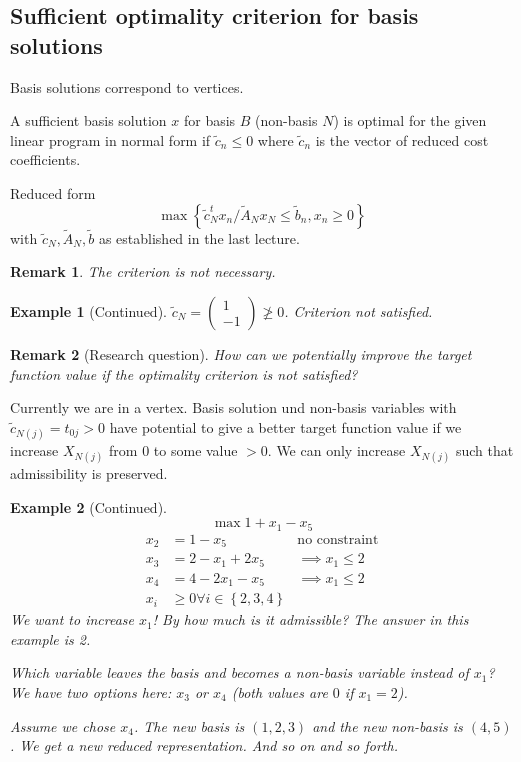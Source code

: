 \documentclass[a4paper]{article}
\numberwithin{lecref}{section}
\newtheorem*{Example}{Example}
\newtheorem*{Remark}{Remark}
\newcommand{\Set}[1]{\left\{#1\right\}}
\begin{document}
\subsection{Sufficient optimality criterion for basis solutions}

Basis solutions correspond to vertices.

A sufficient basis solution $x$ for basis $B$ (non-basis $N$) is optimal for the given linear program in normal form
if $\tilde c_n \leq 0$ where $\tilde c_n$ is the vector of reduced cost coefficients.

\begin{mdframed}
	Reduced form
	\[ \max\Set{\tilde c_N^t x_n / \tilde A_N x_N \leq \tilde b_n, x_n \geq 0} \]
	with $\tilde c_N, \tilde A_N, \tilde b$ as established in the last lecture.
\end{mdframed}

\begin{Remark}
	The criterion is not necessary.
\end{Remark}

\begin{Example}[Continued]
	$\tilde c_N = \begin{pmatrix} 1 \\ -1 \end{pmatrix} \not\geq 0$. Criterion not satisfied.
\end{Example}

\begin{Remark}[Research question]
	How can we potentially improve the target function value if the optimality criterion is not satisfied?
\end{Remark}

Currently we are in a vertex. Basis solution und non-basis variables with $\tilde c_{N(j)} = t_{0j} > 0$ have potential to give a better target function value if we increase $X_{N(j)}$ from 0 to some value $>0$.
We can only increase $X_{N(j)}$ such that admissibility is preserved.

\begin{Example}[Continued]
	\[ \max 1 + x_1 - x_5 \]
	\begin{align*}
		x_2 &= 1 - x_5 & \text{no constraint} \\
		x_3 &= 2 - x_1 + 2x_5 & \implies x_1 \leq 2 \\
		x_4 &= 4 - 2x_1 - x_5 & \implies x_1 \leq 2 \\
		x_i &\geq 0 \forall i \in \Set{2, 3, 4}
	\end{align*}
	We want to increase $x_1$! By how much is it admissible? The answer in this example is 2.

	Which variable leaves the basis and becomes a non-basis variable instead of $x_1$?
	We have two options here: $x_3$ or $x_4$ (both values are $0$ if $x_1 = 2$).

	Assume we chose $x_4$. The new basis is $(1, 2, 3)$ and the new non-basis is $(4,5)$. We get a new reduced representation. And so on and so forth.
\end{Example}
\end{document}
